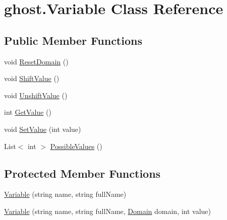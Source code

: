 \hypertarget{classghost_1_1Variable}{\section{ghost.\-Variable Class Reference}
\label{classghost_1_1Variable}
}
\subsection*{Public Member Functions}
\begin{DoxyCompactItemize}
\item 
void \hyperlink{classghost_1_1Variable_abeb22408704798a971c6081a27d02512}{Reset\-Domain} ()
\item 
void \hyperlink{classghost_1_1Variable_a96bc6a1826d8217cbdcbd77c6acd6107}{Shift\-Value} ()
\item 
void \hyperlink{classghost_1_1Variable_a94aabd7fa16ea55c30df67bc9b179300}{Unshift\-Value} ()
\item 
int \hyperlink{classghost_1_1Variable_a13ab07f2257acacecaa3afe9910cd5d8}{Get\-Value} ()
\item 
void \hyperlink{classghost_1_1Variable_a3b1051f1ae8e722e8733a64ee124486d}{Set\-Value} (int value)
\item 
List$<$ int $>$ \hyperlink{classghost_1_1Variable_a4f3523cf1d3b5a8dc6db9f4661bea285}{Possible\-Values} ()
\end{DoxyCompactItemize}
\subsection*{Protected Member Functions}
\begin{DoxyCompactItemize}
\item 
\hyperlink{classghost_1_1Variable_a6f8316e07669cd8bf41257756bca929f}{Variable} (string name, string full\-Name)
\item 
\hyperlink{classghost_1_1Variable_ac314e16271744bd04e8fdfa105b2afde}{Variable} (string name, string full\-Name, \hyperlink{classghost_1_1Domain}{Domain} domain, int value)
\end{DoxyCompactItemize}
